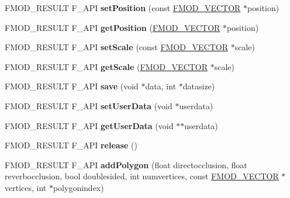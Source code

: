 \begin{DoxyCompactItemize}
F\+M\+O\+D\+\_\+\+R\+E\+S\+U\+LT F\+\_\+\+A\+PI {\bfseries set\+Position} (const \hyperlink{structFMOD__VECTOR}{F\+M\+O\+D\+\_\+\+V\+E\+C\+T\+OR} $\ast$position)
\item 
\mbox{\label{classFMOD_1_1Geometry_a2d0e4a6525b54cd9a39c447995eba296}} 
F\+M\+O\+D\+\_\+\+R\+E\+S\+U\+LT F\+\_\+\+A\+PI {\bfseries get\+Position} (\hyperlink{structFMOD__VECTOR}{F\+M\+O\+D\+\_\+\+V\+E\+C\+T\+OR} $\ast$position)
\item 
\mbox{\label{classFMOD_1_1Geometry_a46104dceeff4a02e5aae989f86951b2f}} 
F\+M\+O\+D\+\_\+\+R\+E\+S\+U\+LT F\+\_\+\+A\+PI {\bfseries set\+Scale} (const \hyperlink{structFMOD__VECTOR}{F\+M\+O\+D\+\_\+\+V\+E\+C\+T\+OR} $\ast$scale)
\item 
\mbox{\label{classFMOD_1_1Geometry_a40f45f30258de49daf8bee7063afa9e9}} 
F\+M\+O\+D\+\_\+\+R\+E\+S\+U\+LT F\+\_\+\+A\+PI {\bfseries get\+Scale} (\hyperlink{structFMOD__VECTOR}{F\+M\+O\+D\+\_\+\+V\+E\+C\+T\+OR} $\ast$scale)
\item 
\mbox{\label{classFMOD_1_1Geometry_a066a05c012e2d41f1ca929ab0328aa25}} 
F\+M\+O\+D\+\_\+\+R\+E\+S\+U\+LT F\+\_\+\+A\+PI {\bfseries save} (void $\ast$data, int $\ast$datasize)
\item 
\mbox{\label{classFMOD_1_1Geometry_a9e7359878a030cf144cfdd773dfce85a}} 
F\+M\+O\+D\+\_\+\+R\+E\+S\+U\+LT F\+\_\+\+A\+PI {\bfseries set\+User\+Data} (void $\ast$userdata)
\item 
\mbox{\label{classFMOD_1_1Geometry_ab8502126a540d836f0fee179f2310c8f}} 
F\+M\+O\+D\+\_\+\+R\+E\+S\+U\+LT F\+\_\+\+A\+PI {\bfseries get\+User\+Data} (void $\ast$$\ast$userdata)
\item 
\mbox{\label{classFMOD_1_1Geometry_ad984475b495e44b9c0ed0b2b1377c65c}} 
F\+M\+O\+D\+\_\+\+R\+E\+S\+U\+LT F\+\_\+\+A\+PI {\bfseries release} ()
\item 
\mbox{\label{classFMOD_1_1Geometry_ad136a5cbb2de501723a3cbdee0165998}} 
F\+M\+O\+D\+\_\+\+R\+E\+S\+U\+LT F\+\_\+\+A\+PI {\bfseries add\+Polygon} (float directocclusion, float reverbocclusion, bool doublesided, int numvertices, const \hyperlink{structFMOD__VECTOR}{F\+M\+O\+D\+\_\+\+V\+E\+C\+T\+OR} $\ast$vertices, int $\ast$polygonindex)
$$
\end{DoxyCompactItemize}
